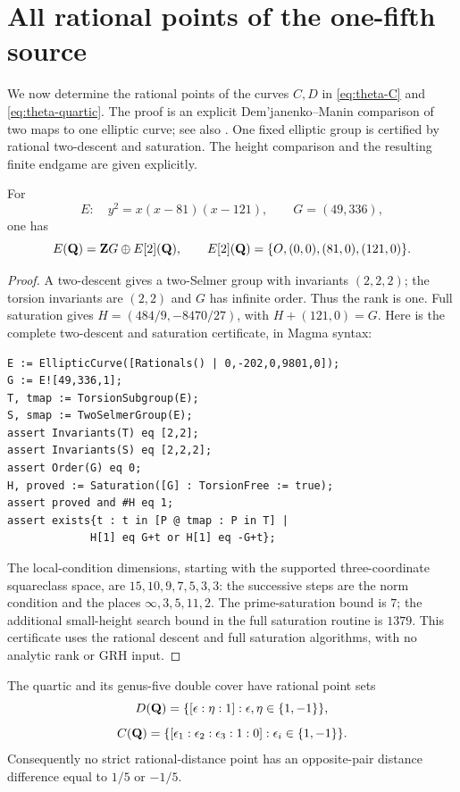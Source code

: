 \section{All rational points of the one-fifth source}
\label{sec:one-fifth-points}

We now determine the rational points of the curves $C,D$ in
\eqref{eq:theta-C} and \eqref{eq:theta-quartic}.  The proof is an
explicit Dem'janenko--Manin comparison of two maps to one elliptic
curve; see also \cite{stoll2011}.  One fixed elliptic group is
certified by rational two-descent and saturation.  The height
comparison and the resulting finite endgame are given explicitly.

\begin{lemma}
\label{lem:fifth-group}
For
\[
 E:\quad y^2=x(x-81)(x-121),\qquad G=(49,336),
\]
one has
\[
 E(\mathbf Q)=\mathbf Z G\oplus E[2](\mathbf Q),\qquad
 E[2](\mathbf Q)=\{O,(0,0),(81,0),(121,0)\}.
\]
\end{lemma}

\begin{proof}
A two-descent gives a two-Selmer group with invariants $(2,2,2)$;
the torsion invariants are $(2,2)$ and $G$ has infinite order.
Thus the rank is one.  Full saturation gives
$H=(484/9,-8470/27)$, with $H+(121,0)=G$.
Here is the complete two-descent and saturation certificate, in Magma syntax:
\begin{verbatim}
E := EllipticCurve([Rationals() | 0,-202,0,9801,0]);
G := E![49,336,1];
T, tmap := TorsionSubgroup(E);
S, smap := TwoSelmerGroup(E);
assert Invariants(T) eq [2,2];
assert Invariants(S) eq [2,2,2];
assert Order(G) eq 0;
H, proved := Saturation([G] : TorsionFree := true);
assert proved and #H eq 1;
assert exists{t : t in [P @ tmap : P in T] |
             H[1] eq G+t or H[1] eq -G+t};
\end{verbatim}
The local-condition dimensions, starting with the supported
three-coordinate squareclass space, are $15,10,9,7,5,3,3$:
the successive steps are the norm condition and the places
$\infty,3,5,11,2$.  The prime-saturation bound is $7$; the
additional small-height search bound in the full saturation routine is $1379$.
This certificate uses the rational descent and full saturation
algorithms, with no analytic rank or GRH input.
\end{proof}

\begin{theorem}
\label{thm:fifth-complete-points}
The quartic and its genus-five double cover have rational point sets
\[
 D(\mathbf Q)=\{[\epsilon:\eta:1]:\epsilon,\eta\in\{1,-1\}\},
\]
\[
 C(\mathbf Q)=\{[\epsilon_1:\epsilon_2:\epsilon_3:1:0]:
                   \epsilon_i\in\{1,-1\}\}.
\]
Consequently no strict rational-distance point has an opposite-pair
distance difference equal to $1/5$ or $-1/5$.
\end{theorem}

